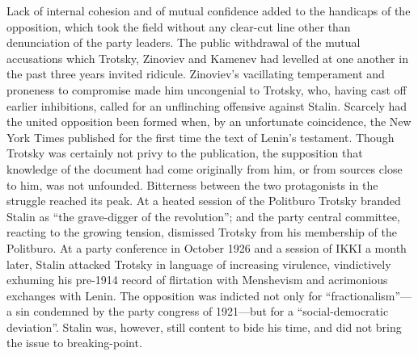 Lack of internal cohesion and of mutual confidence added to the handicaps of the opposition, which took the field without any clear-cut line other than denunciation of the party leaders. The public withdrawal of the mutual accusations which Trotsky, Zinoviev and Kamenev had levelled at one another in the past three years invited ridicule. Zinoviev's vacillating temperament and proneness to compromise made him uncongenial to Trotsky, who, having cast off earlier inhibitions, called for an unflinching offensive against Stalin. Scarcely had the united opposition been formed when, by an unfortunate coincidence, the New York Times published for the first time the text of Lenin's testament. Though Trotsky was certainly not privy to the publication, the supposition that knowledge of the document had come originally from him, or from sources close to him, was not unfounded. Bitterness between the two protagonists in the struggle reached its peak. At a heated session of the Politburo Trotsky branded Stalin as ``the grave-digger of the revolution''; and the party central committee, reacting to the growing tension, dismissed Trotsky from his membership of the Politburo. At a party conference in October 1926 and a session of IKKI a month later, Stalin attacked Trotsky in language of increasing virulence, vindictively exhuming his pre-1914 record of flirtation with Menshevism and acrimonious exchanges with Lenin. The opposition was indicted not only for ``fractionalism''---a sin condemned by the party congress of 1921---but for a ``social-democratic deviation''. Stalin was, however, still content to bide his time, and did not bring the issue to breaking-point. 

